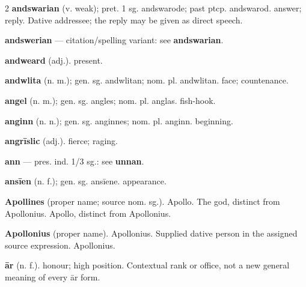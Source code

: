 \begin{multicols*}{2}
\textbf{andswarian} (v. weak); pret. 1 sg. andswarode; past ptcp. andswarod. answer; reply. Dative addressee; the reply may be given as direct speech.\par
\textbf{andswerian} — citation/spelling variant: see \textbf{andswarian}.\par
\textbf{andweard} (adj.). present.\par
\textbf{andwlita} (n. m.); gen. sg. andwlitan; nom. pl. andwlitan. face; countenance.\par
\textbf{angel} (n. m.); gen. sg. angles; nom. pl. anglas. fish-hook.\par
\textbf{anginn} (n. n.); gen. sg. anginnes; nom. pl. anginn. beginning.\par
\textbf{angrīslic} (adj.). fierce; raging.\par
\textbf{ann} — pres. ind. 1/3 sg.: see \textbf{unnan}.\par
\textbf{ansīen} (n. f.); gen. sg. ansīene. appearance.\par
\textbf{Apollines} (proper name; source nom. sg.). Apollo. The god, distinct from Apollonius. Apollo, distinct from Apollonius.\par
\textbf{Apollonius} (proper name). Apollonius. Supplied dative person in the assigned source expression. Apollonius.\par
\textbf{ār} (n. f.). honour; high position. Contextual rank or office, not a new general meaning of every ār form.\par

\end{multicols*}
